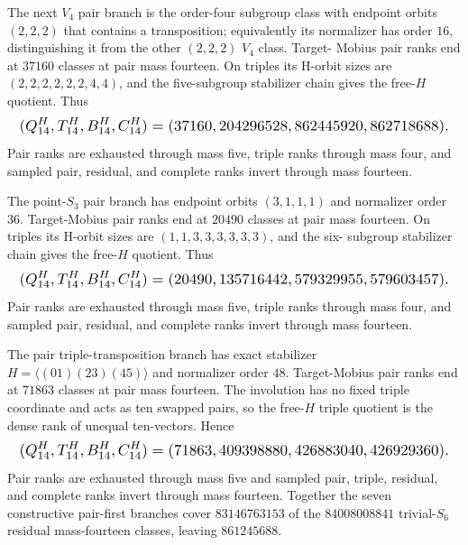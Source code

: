 \documentclass{article}
\newcommand{\fitmath}[1]{\resizebox{0.99\linewidth}{!}{$\displaystyle #1$}}
\begin{document}
The next $V_4$ pair branch is the order-four subgroup class with endpoint
orbits $(2,2,2)$ that contains a transposition; equivalently its normalizer has
order $16$, distinguishing it from the other $(2,2,2)$ $V_4$ class. Target-
Mobius pair ranks end at $37160$ classes at pair mass fourteen. On triples its
H-orbit sizes are $(2,2,2,2,2,2,4,4)$, and the five-subgroup stabilizer chain
gives the free-$H$ quotient. Thus
\begin{equation}
  \fitmath{%
    (Q^H_{14},T^H_{14},B^H_{14},C^H_{14})
      =(37160,204296528,862445920,862718688).
  }
  \label{eq:optimization-crazy-sextuple-s6-pair-three-pair-v4-ranking}
\end{equation}
Pair ranks are exhausted through mass five, triple ranks through mass four, and
sampled pair, residual, and complete ranks invert through mass fourteen.

The point-$S_3$ pair branch has endpoint orbits $(3,1,1,1)$ and normalizer
order $36$. Target-Mobius pair ranks end at $20490$ classes at pair mass
fourteen. On triples its H-orbit sizes are $(1,1,3,3,3,3,3,3)$, and the six-
subgroup stabilizer chain gives the free-$H$ quotient. Thus
\begin{equation}
  \fitmath{%
    (Q^H_{14},T^H_{14},B^H_{14},C^H_{14})
      =(20490,135716442,579329955,579603457).
  }
  \label{eq:optimization-crazy-sextuple-s6-pair-s3-ranking}
\end{equation}
Pair ranks are exhausted through mass five, triple ranks through mass four, and
sampled pair, residual, and complete ranks invert through mass fourteen.

The pair triple-transposition branch has exact stabilizer
$H=\langle(01)(23)(45)\rangle$ and normalizer order $48$. Target-Mobius pair
ranks end at $71863$ classes at pair mass fourteen. The involution has no fixed
triple coordinate and acts as ten swapped pairs, so the free-$H$ triple quotient
is the dense rank of unequal ten-vectors. Hence
\begin{equation}
  \fitmath{%
    (Q^H_{14},T^H_{14},B^H_{14},C^H_{14})
      =(71863,409398880,426883040,426929360).
  }
  \label{eq:optimization-crazy-sextuple-s6-pair-triple-transposition-ranking}
\end{equation}
Pair ranks are exhausted through mass five and sampled pair, triple, residual,
and complete ranks invert through mass fourteen. Together the seven constructive
pair-first branches cover $83146763153$ of the $84008008841$ trivial-$S_6$
residual mass-fourteen classes, leaving $861245688$.
\end{document}
